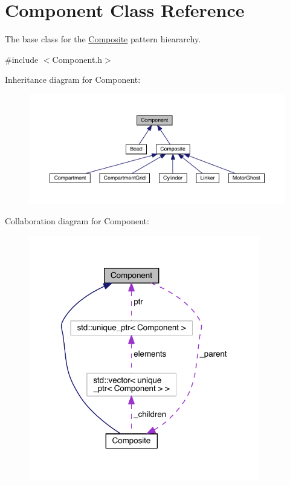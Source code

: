 \hypertarget{classComponent}{\section{Component Class Reference}
\label{classComponent}
}


The base class for the \hyperlink{classComposite}{Composite} pattern hieararchy.  




{\ttfamily \#include $<$Component.\+h$>$}



Inheritance diagram for Component\+:\nopagebreak
\begin{figure}[H]
\begin{center}
\leavevmode
\includegraphics[width=350pt]{classComponent__inherit__graph}
\end{center}
\end{figure}


Collaboration diagram for Component\+:\nopagebreak
\begin{figure}[H]
\begin{center}
\leavevmode
\includegraphics[width=286pt]{classComponent__coll__graph}
\end{center}
\end{figure}
